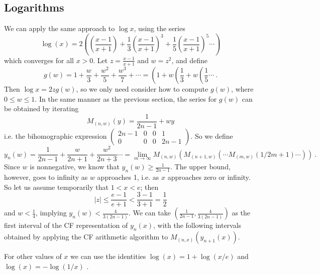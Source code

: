 \documentclass[11pt, oneside]{amsart}   	%
\newcommand{\bihomographic}[8]{\left(\begin{smallmatrix}#1&#2&#3&#4\\#5&#6&#7&#8\end{smallmatrix}\right)}
\renewcommand{\:}{\negthickspace:\negthickspace}
\begin{document}
\subsection{Logarithms} We can apply the same approach to $\log x$, using the series
\[
\log (x) =  2 \left( \left(\frac{x-1}{x+1}\right) + \frac{1}{3}\left(\frac{x-1}{x+1}\right)^3 + \frac{1}{5}\left(\frac{x-1}{x+1}\right)^5 \cdots \right)
\]
which converges for all $x > 0$. Let $z=\frac{x-1}{x+1}$ and $w=z^2$, and define
\[
g(w) = 1 + \frac{w}{3} + \frac{w^2}{5} + \frac{w^3}{7} + \cdots = \left(1 + w\left(\frac{1}{3} + w\left(\frac{1}{5} \cdots \right. \right. \right. \ .
\]
Then $\log x = 2zg(w)$, so we only need consider how to compute $g(w)$, where $0 \leq w \leq 1$.
In the same manner as the previous section, the series for $g(w)$ can be obtained by iterating
\[
M_{(n,w)}(y) = \frac{1}{2n-1} + wy 
\]
i.e. the bihomographic expression $\bihomographic{2n-1}{0}{0}{1}{0}{0}{0}{2n-1}$.
So we define
\[
y_n(w) = \frac{1}{2n-1}  + \frac{w}{2n+1} + \frac{w^2}{2n+3} \cdots = \lim_{m\to\infty} M_{(n,w)}( M_{(n+1,w)}( \cdots M_{(m,w)}(1/2m+1) \cdots ) ) \ .
\]
Since $w$ is nonnegative, we know that $y_n(w) \geq \frac{1}{2n-1}$. The upper bound, however, goes to infinity as $w$ approaches 1, i.e. as $x$ approaches zero or infinity. So let us assume temporarily that $1<x<e$; then 
\[
|z| \leq \frac{e-1}{e+1} < \frac{3-1}{3+1} = \frac{1}{2}
\]
and $w < \frac{1}{4}$, implying $y_n(w) < \frac{4}{3(2n-1)}$.
We can take $(\frac{1}{2n-1}, \frac{4}{3(2n-1)})$ as the first interval of the CF representation of $y_n(x)$, with the following intervals obtained by applying the CF arithmetic algorithm to $M_{(n,x)}(y_{n+1}(x))$.

For other values of $x$  we can use the identities $\log(x)=1+\log(x/e)$ and $\log(x) = -\log(1/x)$ . 



\end{document}
